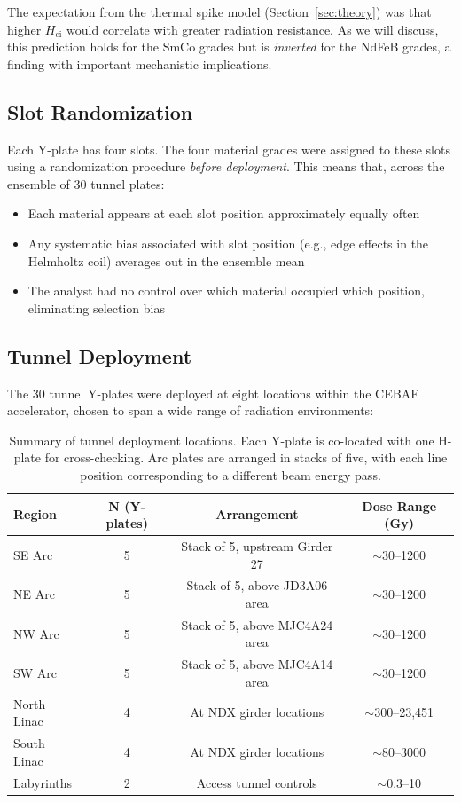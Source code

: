 \documentclass[11pt,letterpaper]{article}
\newcommand{\ndfeb}{NdFeB}
\newcommand{\smco}{SmCo}
\newcommand{\Hci}{H_\mathrm{ci}}
\newcommand{\CEBAF}{CEBAF}
\begin{document}
The expectation from the thermal spike model (Section~\ref{sec:theory}) was
that higher $\Hci$ would correlate with greater radiation resistance. As we
will discuss, this prediction holds for the \smco{} grades but is
\emph{inverted} for the \ndfeb{} grades, a finding with important
mechanistic implications.

\subsection{Slot Randomization}

Each Y-plate has four slots. The four material grades were assigned to these
slots using a randomization procedure \emph{before deployment}. This means
that, across the ensemble of 30 tunnel plates:
\begin{itemize}
    \item Each material appears at each slot position approximately equally
    often
    \item Any systematic bias associated with slot position (e.g., edge effects
    in the Helmholtz coil) averages out in the ensemble mean
    \item The analyst had no control over which material occupied which position,
    eliminating selection bias
\end{itemize}

\subsection{Tunnel Deployment}
\label{sec:deployment}

The 30 tunnel Y-plates were deployed at eight locations within the \CEBAF
accelerator, chosen to span a wide range of radiation environments:

\begin{table}[H]
\centering
\caption{Summary of tunnel deployment locations. Each Y-plate is co-located
with one H-plate for cross-checking. Arc plates are arranged in stacks of five,
with each line position corresponding to a different beam energy pass.}
\label{tab:deployment}
\begin{tabular}{@{}lccc@{}}
\toprule
\textbf{Region} & \textbf{N (Y-plates)} & \textbf{Arrangement} & \textbf{Dose Range (Gy)} \\
\midrule
SE Arc    & 5 & Stack of 5, upstream Girder 27 & $\sim$30--1200 \\
NE Arc    & 5 & Stack of 5, above JD3A06 area & $\sim$30--1200 \\
NW Arc    & 5 & Stack of 5, above MJC4A24 area & $\sim$30--1200 \\
SW Arc    & 5 & Stack of 5, above MJC4A14 area & $\sim$30--1200 \\
North Linac & 4 & At NDX girder locations & $\sim$300--23,451 \\
South Linac & 4 & At NDX girder locations & $\sim$80--3000 \\
Labyrinths  & 2 & Access tunnel controls & $\sim$0.3--10 \\
\bottomrule
\end{tabular}
\end{table}
\end{document}
